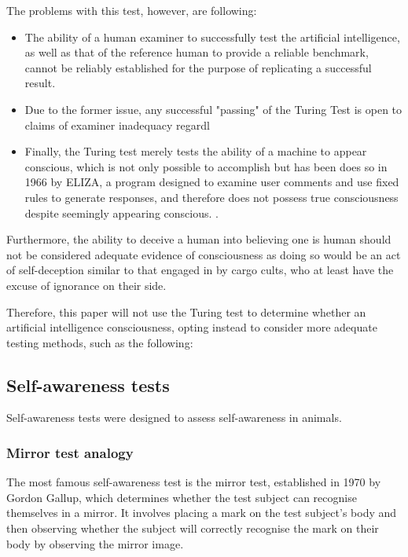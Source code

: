 \documentclass[masterthesis]{fer}
\begin{document}
The problems with this test, however, are following:
\begin{itemize}
\item The ability of a human examiner to successfully test the artificial intelligence, as well as that of the reference human to provide a reliable benchmark, cannot be reliably established for the purpose of replicating a successful result.

\item Due to the former issue, any successful "passing" of the Turing Test is open to claims of examiner inadequacy regardl

\item Finally, the Turing test merely tests the ability of a machine to appear conscious, which is not only possible to accomplish but has been does so in 1966 by ELIZA, a program designed to examine user comments and use fixed rules to generate responses, and therefore does not possess true consciousness despite seemingly appearing conscious.
\cite{ELIZA}.
\end{itemize}


Furthermore, the ability to deceive a human into believing one is human should not be considered adequate evidence of consciousness as doing so would be an act of self-deception similar to that engaged in by cargo cults, who at least have the excuse of ignorance on their side.

Therefore, this paper will not use the Turing test to determine whether an artificial intelligence consciousness, opting instead to consider more adequate testing methods, such as the following:
\subsection{Self-awareness tests}
Self-awareness tests were designed to assess self-awareness in animals.
\subsubsection{Mirror test analogy}
The most famous self-awareness test is the mirror test, established in 1970 by Gordon Gallup, which determines whether the test subject can recognise themselves in a mirror.
It involves placing a mark on the test subject's body and then observing whether the subject will correctly recognise the mark on their body by observing the mirror image.
\end{document}
